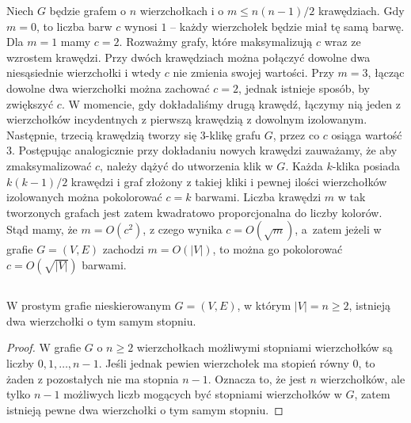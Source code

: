 Niech $G$ będzie grafem o $n$ wierzchołkach i o $m\le n(n-1)/2$ krawędziach. Gdy $m=0$, to liczba barw $c$ wynosi $1$ -- każdy wierzchołek będzie miał tę samą barwę. Dla $m=1$ mamy $c=2$. Rozważmy grafy, które maksymalizują $c$ wraz ze wzrostem krawędzi. Przy dwóch krawędziach można połączyć dowolne dwa niesąsiednie wierzchołki i wtedy $c$ nie zmienia swojej wartości. Przy $m=3$, łącząc dowolne dwa wierzchołki można zachować $c=2$, jednak istnieje sposób, by zwiększyć $c$. W momencie, gdy dokładaliśmy drugą krawędź, łączymy nią jeden z wierzchołków incydentnych z pierwszą krawędzią z dowolnym izolowanym. Następnie, trzecią krawędzią tworzy się $3$-klikę grafu $G$, przez co $c$ osiąga wartość $3$. Postępując analogicznie przy dokładaniu nowych krawędzi zauważamy, że aby zmaksymalizować $c$, należy dążyć do utworzenia klik w $G$. Każda $k$-klika posiada $k(k-1)/2$ krawędzi i graf złożony z takiej kliki i pewnej ilości wierzchołków izolowanych można pokolorować $c=k$ barwami. Liczba krawędzi $m$ w tak tworzonych grafach jest zatem kwadratowo proporcjonalna do liczby kolorów. Stąd mamy, że $m=O(c^2)$, z czego wynika $c=O\left(\sqrt{m}\right)$, a~zatem jeżeli w grafie $G=(V,E)$ zachodzi $m=O(|V|)$, to można go pokolorować $c=O\left(\sqrt{|V|}\right)$ barwami.

\subsection{} %
\subsubsection{} %
\begin{twierdzenie*}
	W prostym grafie nieskierowanym $G=(V,E)$, w którym $|V|=n\ge 2$, istnieją dwa wierzchołki o tym samym stopniu.
\end{twierdzenie*}
\begin{proof}
W grafie $G$ o $n\ge 2$ wierzchołkach możliwymi stopniami wierzchołków są liczby $0,1,\dots,n-1$. Jeśli jednak pewien wierzchołek ma stopień równy $0$, to żaden z pozostałych nie ma stopnia $n-1$. Oznacza to, że jest $n$ wierzchołków, ale tylko $n-1$ możliwych liczb mogących być stopniami wierzchołków w $G$, zatem istnieją pewne dwa wierzchołki o tym samym stopniu.
\end{proof}


